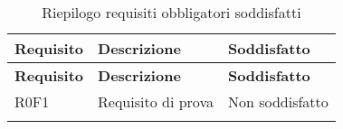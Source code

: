\def\arraystretch{1.5}
\begin{longtable}{p{2cm}!{\VRule[1pt]}p{6cm}!{\VRule[1pt]}p{2cm}!{\VRule[1pt]}}
\color{white} \textbf{Requisito} & \color{white} \textbf{Descrizione} & \color{white} \textbf{Soddisfatto} \\ 
\endfirsthead 
{} 
\color{white} \textbf{Requisito} & \color{white} \textbf{Descrizione} & \color{white} \textbf{Soddisfatto} \\ 
\endhead 
R0F1 & Requisito di prova & {\color{red} Non soddisfatto}\\ 
\caption{Riepilogo requisiti obbligatori soddisfatti}
\end{longtable}